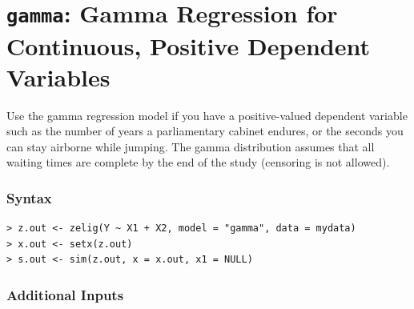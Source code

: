 

\usepackage{Sweave}

\nobibliography*


\section{{\tt gamma}: Gamma Regression for Continuous, Positive Dependent Variables}\label{gamma}

Use the gamma regression model if you have a positive-valued dependent
variable such as the number of years a parliamentary cabinet endures,
or the seconds you can stay airborne while jumping.  The gamma
distribution assumes that all waiting times are complete by the end
of the study (censoring is not allowed).

\subsubsection{Syntax}

\begin{verbatim}
> z.out <- zelig(Y ~ X1 + X2, model = "gamma", data = mydata)
> x.out <- setx(z.out)
> s.out <- sim(z.out, x = x.out, x1 = NULL)
\end{verbatim}

\subsubsection{Additional Inputs} 

